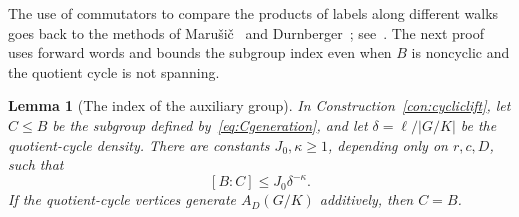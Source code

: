 \documentclass[11pt,a4paper,reqno]{amsart}
\newtheorem{lemma}[theorem]{Lemma}
\theoremstyle{definition}
\theoremstyle{remark}
\numberwithin{equation}{section}
\begin{document}
The use of commutators to compare the products of labels along different walks goes back to the methods of Maru\v{s}i\v{c}~\cite{Marusic} and Durnberger~\cite{Durnberger}; see~\cite[Lemma 2.10 and Section 3]{MorrisPQ}. The next proof uses forward words and bounds the subgroup index even when $B$ is noncyclic and the quotient cycle is not spanning.

\begin{lemma}[The index of the auxiliary group]\label{lem:returnindex}
In Construction~\ref{con:cycliclift}, let $C\le B$ be the subgroup defined by~\eqref{eq:Cgeneration}, and let $\delta=\ell/|G/K|$ be the quotient-cycle density. There are constants $J_0,\kappa\ge1$, depending only on $r,c,D$, such that
\begin{equation}\label{eq:densityindex}
 [B:C]\le J_0\delta^{-\kappa}.
\end{equation}
If the quotient-cycle vertices generate $A_D(G/K)$ additively, then $C=B$.
\end{lemma}
\end{document}
